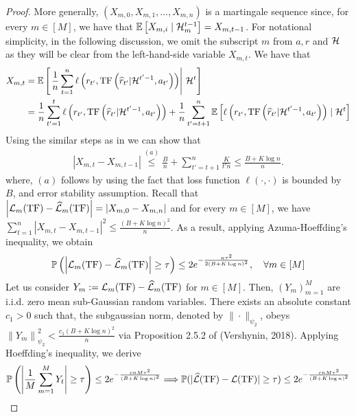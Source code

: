 \documentclass[10pt]{article}
\theoremstyle{plain}
\theoremstyle{definition}
\theoremstyle{remark}
\begin{document}
\begin{proof}
More generally, $\left(X_{m, 0}, X_{m, 1}, \ldots, X_{m, n}\right)$ is a martingale sequence since, for every $m \in [M]$, we have that $\mathbb{E}\left[X_{m, i} \mid \mathcal{H}_m^{t-1}\right]=X_{m, t-1}$.
For notational simplicity, in the following discussion, we omit the subscript $m$ from $a, r$ and $\mathcal{H}$ as they will be clear from the left-hand-side variable $X_{m, t}$. We have that
\begin{align*}
X_{m, t} & =\mathbb{E}\left[\left.\frac{1}{n} \sum_{t=1}^n \ell\left(r_{t'}, \operatorname{TF}\left(\widehat{r}_{t'}|\mathcal{H}^{t'-1}, a_{t'}\right)\right) \right\rvert\, \mathcal{H}^t\right] \\
& =\frac{1}{n} \sum_{t'=1}^t \ell\left(r_{t'}, \operatorname{TF}\left(\widehat{r}_{t'}|\mathcal{H}^{t'-1}, a_{t'}\right)\right)+\frac{1}{n} \sum_{t'=t+1}^n \mathbb{E}\left[\ell\left(r_{t'}, \operatorname{TF}\left(\widehat{r}_{t'}|\mathcal{H}^{t'-1}, a_{t'}\right)\right) \mid \mathcal{H}^t\right]
\end{align*}
Using the similar steps as in \citet{li2023transformers} we can show that
\begin{align*}
    \left|X_{m, t}-X_{m, t-1}\right| \overset{(a)}{\leq} \frac{B}{n}+\sum_{t'=t+1}^n \frac{K}{t' n} \leq \frac{B+K \log n}{n} .
\end{align*}
where, $(a)$ follows by using the fact that loss function $\ell(\cdot, \cdot)$ is bounded by $B$, and error stability assumption.
Recall that $\left|\mathcal{L}_m(\mathrm{TF})-\widehat{\mathcal{L}}_m(\mathrm{TF})\right|=\left|X_{m, 0}-X_{m, n}\right|$ and for every $m \in[M]$, we have $\sum_{t=1}^n\left|X_{m, t}-X_{m, t-1}\right|^2 \leq \frac{(B+K \log n)^2}{n}$. As a result, applying Azuma-Hoeffding's inequality, we obtain
\begin{align}
    \mathbb{P}\left(\left|\mathcal{L}_m(\mathrm{TF})-\widehat{\mathcal{L}}_m(\mathrm{TF})\right| \geq \tau\right) \leq 2 e^{-\frac{n \tau^2}{2(B+K \log n)^2}}, \quad \forall m \in[M]  \label{eq:azuma}
\end{align}
Let us consider $Y_m:=\mathcal{L}_m(\mathrm{TF})-\widehat{\mathcal{L}}_m(\mathrm{TF})$ for $m \in[M]$. Then, $\left(Y_m\right)_{m=1}^M$ are i.i.d. zero mean sub-Gaussian random variables. There exists an absolute constant $c_1>0$ such that, the subgaussian norm, denoted by $\|\cdot\|_{\psi_2}$, obeys $\left\|Y_m\right\|_{\psi_2}^2<\frac{c_1(B+K \log n)^2}{n}$ via Proposition 2.5.2 of (Vershynin, 2018). Applying Hoeffding's inequality, we derive
\begin{align*}
    \Pb\left(\left|\frac{1}{M} \sum_{m=1}^M Y_t\right| \geq \tau\right) \leq 2 e^{-\frac{c n M \tau^2}{(B+K \log n)^2}} \Longrightarrow \Pb(|\widehat{\L}(\T)-\L(\T)| \geq \tau) \leq 2 e^{-\frac{c n M \tau^2}{(B+K \log n)^2}}

\end{align*}
\end{proof}
\end{document}
